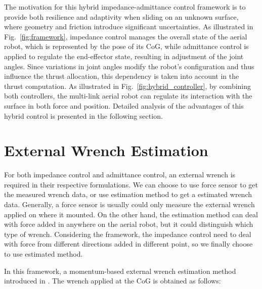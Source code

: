 The motivation for this hybrid impedance-admittance control framework is to provide both resilience and adaptivity when sliding on an unknown surface, where geometry and friction introduce significant uncertainties. As illustrated in Fig.~\ref{fig:framework}, impedance control manages the overall state of the aerial robot, which is represented by the pose of its CoG, while admittance control is applied to regulate the end-effector state, resulting in adjustment of the joint angles. Since variations in joint angles modify the robot’s configuration and thus influence the thrust allocation, this dependency is taken into account in the thrust computation.
As illustrated in Fig.~\ref{fig:hybrid_controller}, by combining both controllers, the multi-link aerial robot can regulate its interaction with the surface in both force and position. Detailed analysis of the advantages of this hybrid control is presented in the following section.

\section{External Wrench Estimation}

For both impedance control and admittance control, an external wrench is required in their respective formulations. We can choose to use force sensor to get the measured wrench data, or use estimation method to get a estimated wrench data. Generally, a force sensor is usually could only measure the external wrench applied on where it mounted. On the other hand, the estimation method can deal with force added in anywhere on the aerial robot, but it could distinguish which type of wrench. Considering the framework, the impedance control need to deal with force from different directions added in different point, so we finally choose to use estimated method.

In this framework, a momentum-based external wrench estimation method introduced in \cite{ruggiero_2014_impedance}. The wrench applied at the CoG is obtained as follows:

